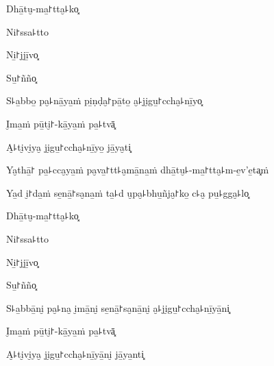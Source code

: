 Dhā̱tu̮-ma̱꜓tta̮꜕ko͓


Ni꜓ssa꜕tto


Ni̱꜓jjī̱vo͓


Su̱꜓ñño͓


S꜕a̱bbo̱ pa̮꜕nā̱ya̱ṁ pi̱ṇḍa̮꜓pā̱to̱ a̮꜕ji̮gu̱꜓ccha̮꜕nī̱yo͓


\clearpage

I̮ma̱ṁ pū̱ti̮꜓-kā̱ya̱ṁ pa̱꜕tvā͓


A̮꜕ti̮vi̮ya̮ ji̮gu̱꜓ccha̮꜕nī̱yo̱ jā̱ya̮ti͓


Ya̮thā̱꜓ pa̱꜕cca̮ya̱ṁ pa̮va̱꜓tt꜕a̮mā̱na̱ṁ dhā̱tu̮꜕-ma̱꜓tta̮꜕m-e̱v'e̱ta͓ṁ


Ya̱d i̮꜓da̱ṁ se̱nā̱꜓sa̮na̱ṁ ta̱꜕d u̮pa̮꜕bhu̱ñja̮꜓ko̱ c꜕a̮ pu̱꜕gga̮꜕lo͓


Dhā̱tu̮-ma̱꜓tta̮꜕ko͓


Ni꜓ssa꜕tto


Ni̱꜓jjī̱vo͓


Su̱꜓ñño͓


S꜕a̱bbā̱ni̮ pa̮꜕na̮ i̮mā̱ni̮ se̱nā̱꜓sa̮nā̱ni̮ a̮꜕ji̮gu̱꜓ccha̮꜕nī̱yā̱ni͓


\clearpage

I̮ma̱ṁ pū̱ti̮꜓-kā̱ya̱ṁ pa̱꜕tvā͓


A̮꜕ti̮vi̮ya̮ ji̮gu̱꜓ccha̮꜕nī̱yā̱ni̮ jā̱ya̱nti͓


